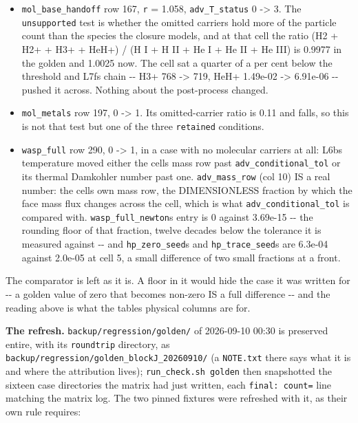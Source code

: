\documentclass[english,a4paper]{my_memo}
\providecommand{\tightlist}{\setlength{\itemsep}{0pt}\setlength{\parskip}{0pt}}
\begin{document}
\begin{itemize}
\tightlist
\item
  \texttt{mol\_base\_handoff} row 167, \texttt{r} = 1.058, \texttt{adv\_T\_status} 0 -\textgreater{} 3. The
  \texttt{unsupported} test is whether the omitted carriers hold more of the particle
  count than the species the closure models, and at that cell the ratio
  (H2 + H2+ + H3+ + HeH+) / (H I + H II + He I + He II + He III) is 0.9977 in
  the golden and 1.0025 now. The cell sat a quarter of a per cent below the
  threshold and L7f\textquotesingle s chain -\/- H3+ 768 -\textgreater{} 719, HeH+ 1.49e-02 -\textgreater{} 6.91e-06 -\/-
  pushed it across. Nothing about the post-process changed.
\item
  \texttt{mol\_metals} row 197, 0 -\textgreater{} 1. Its omitted-carrier ratio is 0.11 and falls,
  so this is not that test but one of the three \texttt{retained} conditions.
\item
  \texttt{wasp\_full} row 290, 0 -\textgreater{} 1, in a case with no molecular carriers at all:
  L6b\textquotesingle s temperature moved either the cell\textquotesingle s mass row past
  \texttt{adv\_conditional\_tol} or its thermal Damkohler number past one.
  \texttt{adv\_mass\_row} (col 10) IS a real number: the cell\textquotesingle s own mass row, the
  DIMENSIONLESS fraction by which the face mass flux changes across the cell,
  which is what \texttt{adv\_conditional\_tol} is compared with. \texttt{wasp\_full\_newton}\textquotesingle s
  entry is 0 against 3.69e-15 -\/- the rounding floor of that fraction, twelve
  decades below the tolerance it is measured against -\/- and \texttt{hp\_zero\_seed}\textquotesingle s and
  \texttt{hp\_trace\_seed}\textquotesingle s are 6.3e-04 against 2.0e-05 at cell 5, a small difference of
  two small fractions at a front.
\end{itemize}

The comparator is left as it is. A floor in it would hide the case it was
written for -\/- a golden value of zero that becomes non-zero IS a full
difference -\/- and the reading above is what the table\textquotesingle s physical columns are
for.

\textbf{The refresh.} \texttt{backup/regression/golden/} of 2026-09-10 00:30 is preserved
entire, with its \texttt{roundtrip} directory, as
\texttt{backup/regression/golden\_blockJ\_20260910/} (a \texttt{NOTE.txt} there says what it
is and where the attribution lives); \texttt{run\_check.sh\ golden} then snapshotted the
sixteen case directories the matrix had just written, each \texttt{final:\ count=} line
matching the matrix log. The two pinned fixtures were refreshed with it, as
their own rule requires:
\end{document}
